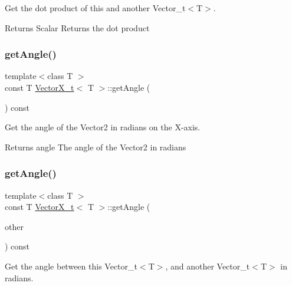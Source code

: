 Get the dot product of this and another Vector\+\_\+t$<$\+T$>$. 

\begin{DoxyReturn}{Returns}
Scalar Returns the dot product 
\end{DoxyReturn}
\mbox{\label{class_vector_x__t_a7e497c0abad76724767e78644ff91e35}} 
\subsubsection{\texorpdfstring{get\+Angle()}{getAngle()}\hspace{0.1cm}{\footnotesize\ttfamily [1/2]}}
{\footnotesize\ttfamily template$<$class T $>$ \\
const T \hyperlink{class_vector_x__t}{Vector\+X\+\_\+t}$<$ T $>$\+::get\+Angle (\begin{DoxyParamCaption}{ }\end{DoxyParamCaption}) const}



Get the angle of the Vector2 in radians on the X-\/axis. 

\begin{DoxyReturn}{Returns}
angle The angle of the Vector2 in radians 
\end{DoxyReturn}
\mbox{\label{class_vector_x__t_a875b1e98058eafffead7e4a0e39496f9}} 
\subsubsection{\texorpdfstring{get\+Angle()}{getAngle()}\hspace{0.1cm}{\footnotesize\ttfamily [2/2]}}
{\footnotesize\ttfamily template$<$class T $>$ \\
const T \hyperlink{class_vector_x__t}{Vector\+X\+\_\+t}$<$ T $>$\+::get\+Angle (\begin{DoxyParamCaption}\item[{const \hyperlink{class_vector_x__t}{Vector\+X\+\_\+t}$<$ T $>$ \&}]{other }\end{DoxyParamCaption}) const}



Get the angle between this Vector\+\_\+t$<$\+T$>$, and another Vector\+\_\+t$<$\+T$>$ in radians. 

